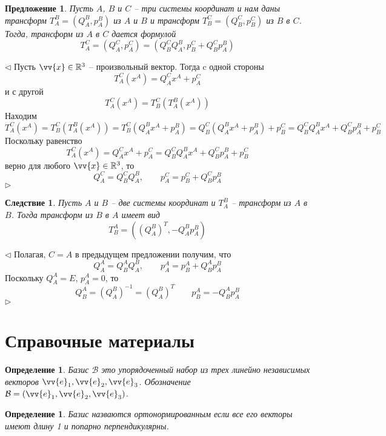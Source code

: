 \documentclass[12pt]{article}
\newtheorem{proposition}[theorem]{Предложение}
\newtheorem{corollary}[theorem]{Следствие}
\newtheorem{definition}[theorem]{Определение}
\newenvironment{proof}{\par $\triangleleft$}{$\triangleright$}
\begin{document}
\begin{proposition}
    Пусть $A$, $B$ и $C$ -- три системы координат и нам даны
    трансформ $T_A^B=(Q_A^B,p_A^B)$ из $A$ и $B$ и трансформ $T_B^C=(Q_B^C,p_B^C)$ из $B$ в $C$.
    Тогда, трансформ из $A$ в $C$ дается формулой
    $$
        T_A^C=(Q_A^C, p_A^C)=(Q_B^C Q_A^B, p_B^C+Q_B^C p_A^B)
    $$
\end{proposition}
\begin{proof}
    Пусть $\vv{x}\in\mathbb{R}^3$ -- произвольный вектор. Тогда c одной стороны
    $$
        T_A^C(x^A)=Q_A^C x^A+p_A^C
    $$
    и с другой
    $$
        T_A^C(x^A)=T_B^C(T_A^B(x^A))
    $$
    Находим
    $$
        T_A^C(x^A)=T_B^C(T_A^B(x^A))
            =T_B^C(Q_A^B x^A+p_A^B)
            =Q_B^C(Q_A^B x^A+p_A^B)+p_B^C
            =Q_B^C Q_A^B x^A + Q_B^C p_A^B + p_B^C
    $$
    Поскольку равенство
    $$
        T_A^C(x^A)=Q_A^C x^A+p_A^C=Q_B^C Q_A^B x^A + Q_B^C p_A^B + p_B^C
    $$
    верно для любого $\vv{x}\in\mathbb{R}^3$, то
    $$
        Q_A^C=Q_B^C Q_A^B, \quad\quad p_A^C=p_B^C+Q_B^C p_A^B
    $$
\end{proof}

\begin{corollary}
    Пусть $A$ и $B$ -- две системы координат и $T_A^B$ -- трансформ из $A$ в $B$.
    Тогда трансформ из $B$ в $A$ имеет вид
    $$
        T_B^A=((Q_A^B)^T,-Q_A^B p_A^B)
    $$
\end{corollary}
\begin{proof}
    Полагая, $C=A$ в предыдущем предложении
    получим, что
    $$
        Q_A^A=Q_B^A Q_A^B, \quad\quad p_A^A=p_B^A+Q_B^A p_A^B
    $$
    Поскольку $Q_A^A=E$, $p_A^A=0$, то
    $$
        Q_B^A=(Q_A^B)^{-1}=(Q_A^B)^T \quad \quad p_B^A=-Q_B^A p_A^B
    $$
\end{proof}


\section{Справочные материалы}

\begin{definition}
    Базис $\mathcal{B}$ это упорядоченный набор из трех линейно независимых векторов
    $\vv{e}_1, \vv{e}_2, \vv{e}_3$.
    Обозначение $\mathcal{B}=(\vv{e}_1, \vv{e}_2, \vv{e}_3)$.
\end{definition}

\begin{definition}
    Базис назваются ортонормированным если все его векторы имеют длину 1
    и попарно перпендикулярны.
\end{definition}
\end{document}
